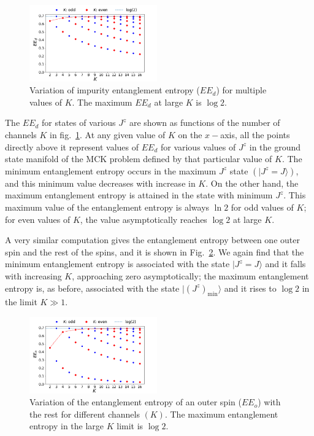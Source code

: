 \documentclass[reprint,prb,superscriptaddress]{revtex4-2}
\begin{document}
\begin{figure}[!htpb]
\centering
\includegraphics[width=0.49\textwidth]{EEmultichannelANN.png}
\caption{Variation of impurity entanglement entropy ($EE_d$) for multiple values of \(K\). The maximum \(EE_d\) at large \(K\) is $\log 2$.}
\label{fig:EE_d}
\end{figure}
The \(EE_d\) for states of various \(J^z\) are shown as functions of the number of channels \(K\) in fig.~\ref{fig:EE_d}. At any given value of \(K\) on the \(x-\)axis, all the points directly above it represent values of \(EE_d\) for various values of \(J^z\) in the ground state manifold of the MCK problem defined by that particular value of \(K\). The minimum entanglement entropy occurs in the maximum \(J^z\) state $\left(|J^z=J\rangle\right)$, and this minimum value decreases with increase in \(K\). On the other hand, the maximum entanglement entropy is attained in the state with minimum \(J^z\). This maximum value of the entanglement entropy is always \(\ln 2\) for odd values of \(K\); for even values of \(K\), the value asymptotically reaches $\log 2$ at large \(K\). 

A very similar computation gives the entanglement entropy between one outer spin and the rest of the spins, and it is shown in Fig.~\ref{fig:EE_outer}.
We again find that the minimum entanglement entropy is associated with the state $|J^z=J\rangle$ and it falls with increasing \(K\), approaching zero asymptotically; the maximum entanglement entropy is, as before, associated with the state $|\left(J^z\right)_\mathrm{min}\rangle$ and it rises to $\log 2$ in the limit $K\gg 1$.
\begin{figure}[!htpb]
\centering
\includegraphics[width=0.49\textwidth]{outerEEmultichannelANN.png}
\caption{Variation of the entanglement entropy of an outer spin ($EE_o$) with the rest for different channels $(K)$. The maximum entanglement entropy in the large $K$ limit is $\log 2$.}
\label{fig:EE_outer}
\end{figure}
\end{document}

